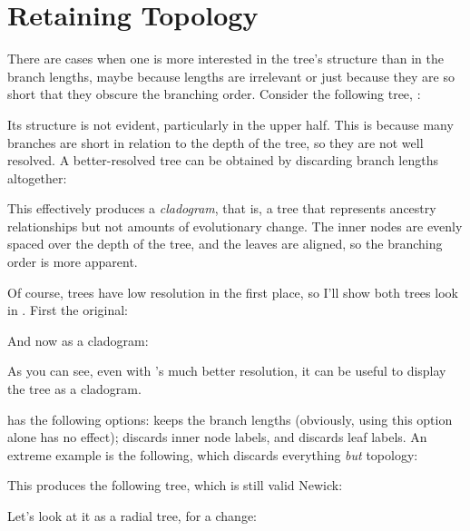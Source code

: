 \section[sct_topology]{Retaining Topology}

There are cases when one is more interested in the tree's structure than in the
branch lengths, maybe because lengths are irrelevant or just because they are
so short that they obscure the branching order. Consider the following tree,
:


Its structure is not evident, particularly in the upper half. This is because
many branches are short in relation to the depth of the tree, so they are not
well resolved. A better-resolved tree can be obtained by discarding branch
lengths altogether:


This effectively produces a {\em cladogram}, that is, a tree that represents
ancestry relationships but not amounts of evolutionary change. The inner nodes
are evenly spaced over the depth of the tree, and the leaves are aligned, so
the branching order is more apparent.

Of course, \ascii{} trees have low resolution in the first place, so I'll show
both trees look in \svg. First the original: 


And now as a cladogram:


As you can see, even with \svg{}'s much better resolution, it can be useful to
display the tree as a cladogram.

\topology{} has the following options:  keeps the branch lengths
(obviously, using this option alone has no effect);  discards inner
node labels, and  discards leaf labels. An extreme example is the
following, which discards everything {\em but} topology:


This produces the following tree, which is still valid Newick:


Let's look at it as a radial tree, for a change:

